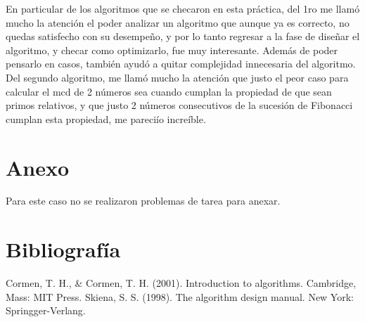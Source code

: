 \documentclass[12pt,twoside]{article}
\begin{document}
En particular de los algoritmos que se checaron en esta pr\'actica, del 1ro me llam\'o mucho la atenci\'on el 
poder analizar un algoritmo que aunque ya es correcto, no quedas satisfecho con su desempeño, y por lo tanto regresar a la fase de diseñar el algoritmo, y checar como optimizarlo, fue muy interesante. Además de poder pensarlo en casos, tambi\'en ayud\'o a quitar complejidad innecesaria del algoritmo. Del segundo algoritmo, me llam\'o mucho la atenci\'on que justo el peor caso para calcular el mcd de 2 n\'umeros sea cuando cumplan la propiedad de que sean primos relativos, y que justo 2
n\'umeros consecutivos de la sucesi\'on de Fibonacci cumplan esta propiedad, me pareci\'io incre\'ible.

\section{Anexo}
Para este caso no se realizaron problemas de tarea para anexar.

\section{Bibliograf\'ia}

Cormen, T. H., \& Cormen, T. H. (2001). Introduction to algorithms. Cambridge, Mass: MIT Press.
\newline
Skiena, S. S. (1998). The algorithm design manual. New York: Springger-Verlang.
\medskip
\end{document}
